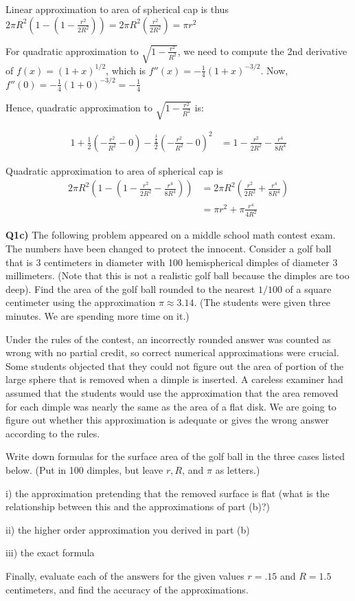 \documentclass[9pt]{article}
\begin{document}
Linear approximation to area of spherical cap is thus $2 \pi R^2 (1 - (1 - \frac{r^2}{2R^2})) = 2 \pi R^2 (\frac{r^2}{2R^2}) = \pi r^2$

For quadratic approximation to $\sqrt{1 - \frac{r^2}{R^2}}$, we need to compute the 2nd derivative of $f(x) = (1 + x)^{1/2}$, which is $f''(x) = -\frac{1}{4}(1 + x)^{-3/2}$. Now, $f''(0) = -\frac{1}{4}(1 + 0)^{-3/2} = -\frac{1}{4}$

Hence, quadratic approximation to $\sqrt{1 - \frac{r^2}{R^2}}$ is:

\begin{align*}
  1 + \frac{1}{2}(-\frac{r^2}{R^2} - 0) - \frac{\frac{1}{4}}{2}(-\frac{r^2}{R^2} - 0)^2 &= 1 - \frac{r^2}{2R^2} - \frac{r^4}{8R^4}
\end{align*}

Quadratic approximation to area of spherical cap is
\begin{align*}
  2 \pi R^2 (1 - (1 - \frac{r^2}{2R^2} - \frac{r^4}{8R^4})) &= 2 \pi R^2 (\frac{r^2}{2R^2} + \frac{r^4}{8R^4}) \\
                                                            &= \pi r^2 + \pi \frac{r^4}{4R^2}
\end{align*}


\begin{tcolorbox}
	  \parskip10pt\relax
  \textbf{Q1c)} The following problem appeared on a middle school math contest exam. The numbers have been changed to protect the innocent. Consider a golf ball that is 3 centimeters in diameter with 100 hemispherical dimples of diameter 3 millimeters. (Note that this is not a realistic golf ball because the dimples are too deep). Find the area of the golf ball rounded to the nearest $1/100$ of a square centimeter using the approximation $\pi \approx 3.14$. (The students were given three minutes. We are spending more time on it.)

  Under the rules of the contest, an incorrectly rounded answer was counted as wrong with no partial credit, so correct numerical approximations were crucial. Some students objected that they could not figure out the area of portion of the large sphere that is removed when a dimple is inserted. A careless examiner had assumed that the students would use the approximation that the area removed for each dimple was nearly the same as the area of a flat disk. We are going to figure out whether this approximation is adequate or gives the wrong answer according to the rules.

  Write down formulas for the surface area of the golf ball in the three cases listed below. (Put in 100 dimples, but leave $r, R$, and $\pi$ as letters.)
  
  i) the approximation pretending that the removed surface is flat (what is the relationship between this and the approximations of part (b)?)
  
  ii) the higher order approximation you derived in part (b)
  
  iii) the exact formula
  
  Finally, evaluate each of the answers for the given values $r = .15$ and $R = 1.5$ centimeters, and find the accuracy of the approximations.
\end{tcolorbox}
\end{document}
